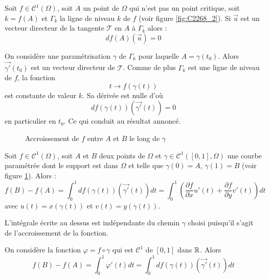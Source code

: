 \begin{prop}
 Soit $f\in \mathcal C^1(\Omega)$, soit $A$ un point de $\Omega$ qui n'est pas un point critique, soit $k=f(A)$ et $\Gamma_k$ la ligne de niveau $k$ de $f$ (voir figure \ref{fig:C2268_2}). Si $\overrightarrow u$ est un vecteur directeur de la tangente $\mathcal T$ en $A$ à $\Gamma_k$ alors :
\begin{displaymath}
 df(A)(\overrightarrow u) = 0
\end{displaymath}
\end{prop}
\begin{demo}
 On considère une paramétrisation $\gamma$ de $\Gamma_k$ pour laquelle $A=\gamma(t_0)$. Alors $\overrightarrow{\gamma'}(t_0)$ est un vecteur directeur de $\mathcal T$. Comme de plus $\Gamma_k$ est une ligne de niveau de $f$, la fonction 
\begin{displaymath}
 t \rightarrow f(\gamma(t))
\end{displaymath}
est constante de valeur $k$. Sa dérivée est nulle d'où
\begin{displaymath}
 df(\gamma(t))(\overrightarrow{\gamma'}(t)) = 0
\end{displaymath}
en particulier en $t_0$. Ce qui conduit au résultat annoncé.
\end{demo}

\begin{figure}[ht]
 \centering

\caption{Accroissement de $f$ entre $A$ et $B$ le long de $\gamma$}
\label{fig:C2268_3}
\end{figure}
\begin{prop}
 Soit $f\in \mathcal C^1(\Omega)$, soit $A$ et $B$ deux points de $\Omega$ et $\gamma\in\mathcal C^1([0,1],\Omega)$ une courbe paramétrée dont le support est dans $\Omega$ et telle que $\gamma(0)=A$, $\gamma(1)=B$ (voir figure \ref{fig:C2268_3}). Alors :
\begin{displaymath}
 f(B)-f(A) =
\int_{0}^{1} df(\gamma(t))(\overrightarrow{\gamma'}(t))dt
= \int_{0}^{1}
\left(
\dfrac{\partial f}{\partial x}u'(t) +
\dfrac{\partial f}{\partial y}v'(t)
\right) dt
\end{displaymath}
avec $u(t)=x(\gamma(t))$ et $v(t)=y(\gamma(t))$.
\end{prop}
\begin{rem}
 L'intégrale écrite au dessus est indépendante du chemin $\gamma$ choisi puisqu'il s'agit de l'accroissement de la fonction.
\end{rem}

\begin{demo}
 On considère la fonction $\varphi=f\circ \gamma$ qui est $\mathcal C^1$ de $[0,1]$ dans $\mathbb{R}$. Alors
\begin{displaymath}
 f(B)-f(A)=\int_{0}^{1}\varphi'(t)dt = \int_{0}^{1} df(\gamma(t))(\overrightarrow{\gamma'}(t))dt
\end{displaymath}
\end{demo}


